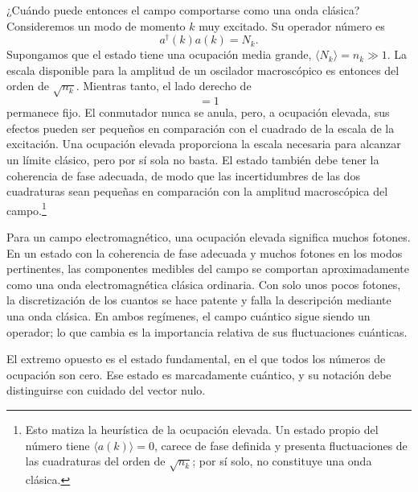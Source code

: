 ¿Cuándo puede entonces el campo comportarse como una onda clásica? Consideremos un modo de momento \(k\) muy excitado. Su operador número es
\begin{equation}
a^\dagger(k)a(k)=N_k.
\end{equation}
Supongamos que el estado tiene una ocupación media grande, \(\langle N_k\rangle=n_k\gg 1\). La escala disponible para la amplitud de un oscilador macroscópico es entonces del orden de \(\sqrt{n_k}\). Mientras tanto, el lado derecho de
\begin{equation}
[a(k),a^\dagger(k)]=1
\end{equation}
permanece fijo. El conmutador nunca se anula, pero, a ocupación elevada, sus efectos pueden ser pequeños en comparación con el cuadrado de la escala de la excitación. Una ocupación elevada proporciona la escala necesaria para alcanzar un límite clásico, pero por sí sola no basta. El estado también debe tener la coherencia de fase adecuada, de modo que las incertidumbres de las dos cuadraturas sean pequeñas en comparación con la amplitud macroscópica del campo.\footnote{Esto matiza la heurística de la ocupación elevada. Un estado propio del número tiene \(\langle a(k)\rangle=0\), carece de fase definida y presenta fluctuaciones de las cuadraturas del orden de \(\sqrt{n_k}\); por sí solo, no constituye una onda clásica.}

Para un campo electromagnético, una ocupación elevada significa muchos fotones. En un estado con la coherencia de fase adecuada y muchos fotones en los modos pertinentes, las componentes medibles del campo se comportan aproximadamente como una onda electromagnética clásica ordinaria. Con solo unos pocos fotones, la discretización de los cuantos se hace patente y falla la descripción mediante una onda clásica. En ambos regímenes, el campo cuántico sigue siendo un operador; lo que cambia es la importancia relativa de sus fluctuaciones cuánticas.

\begin{classroomqa}
\end{classroomqa}

El extremo opuesto es el estado fundamental, en el que todos los números de ocupación son cero. Ese estado es marcadamente cuántico, y su notación debe distinguirse con cuidado del vector nulo.

